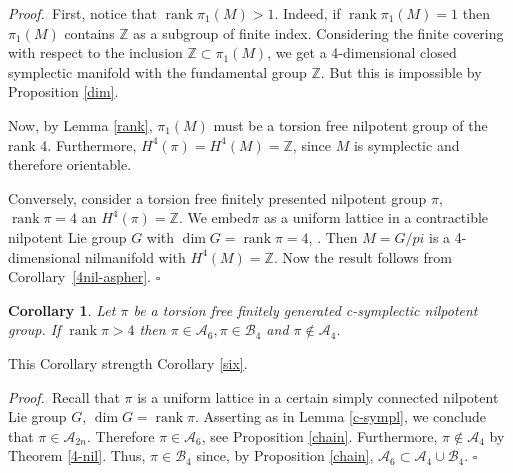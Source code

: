 \documentclass[12pt, twoside]{amsart}
\theoremstyle{plain}
\newtheorem{cory}[theorem]{Corollary}
\theoremstyle{definition}
\numberwithin{equation}{section}
\def\ZZ{\mathbb Z}
\def\dim{\operatorname {dim}}
\def\rk{\operatorname {rank}}
\def\hqed{\hfill\hfill$\square$}
\def\AAA{{\mathcal A}}
\def\BBB{{\mathcal B}}
\def\ZZ{\mathbb Z}
\def\m{\medskip}
\def\p{{\it Proof.\ }}
\begin{document}
\p First, notice that $\rk \pi_1(M) >1$. Indeed, if $\rk \pi_1(M) =1$ then 
$\pi_1(M)$ contains $\ZZ$ as a subgroup of finite index. Considering the 
finite 
covering with respect to the inclusion $\ZZ \subset \pi_1(M)$, we get a 
4-dimensional closed symplectic manifold with the fundamental group $\ZZ$. But 
this is impossible by Proposition \ref{dim}.

\m Now, by Lemma \ref{rank}, $\pi_1(M)$  must be a torsion free nilpotent 
group 
of the rank 4. Furthermore, $H^4(\pi)=H^4(M)=\ZZ$, since $M$ is symplectic and 
therefore orientable.

\m Conversely, consider a torsion free finitely presented nilpotent group 
$\pi$, 
$\rk \pi=4$ an $H^4(\pi)=\ZZ$. We embed$\pi$ as a 
uniform lattice in a contractible nilpotent Lie group $G$ with $\dim G = \rk 
\pi=4$, \cite{M}. Then $M=G/pi$ is a 4-dimensional nilmanifold with 
$H^4(M)=\ZZ$. Now the result follows from Corollary~\ref{4nil-aspher}.
\hqed

\begin{cory}
Let $\pi$ be a torsion free finitely generated c-symplectic nilpotent group. 
If 
$\rk \pi > 4$ then $\pi\in \AAA_6, \pi\in \BBB_4$ and $\pi \notin \AAA_4$.
\end{cory}

This Corollary strength Corollary \ref{six}.

\p Recall that $\pi$ is a uniform lattice in a certain simply connected 
nilpotent Lie group 
$G$, $\dim G =\rk \pi$. Asserting as in Lemma \ref{c-sympl}, we conclude that 
$\pi\in 
\AAA_{2n}$. Therefore $\pi \in \AAA_6$, see Proposition \ref{chain}. 
Furthermore, $\pi\notin \AAA_4$ by Theorem \ref{4-nil}. Thus, $\pi\in \BBB_4$ 
since, by Proposition \ref{chain}, $\AAA_6\subset \AAA_4\cup \BBB_4$.
\hqed 
\end{document}
